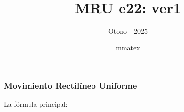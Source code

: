 \documentclass{beamer}
\title{MRU e22: ver1}
\subtitle{Otono - 2025}
\author{mmatex}
\begin{document}
\maketitle

\begin{frame}
\frametitle{Movimiento Rectil\'ineo Uniforme}
% 
 La f\'ormula principal:

                                                               
 
{\huge \vmru}
\vNUa
                                                               
                                                               
                                                               
                                                               
\end{frame}
\end{document}
